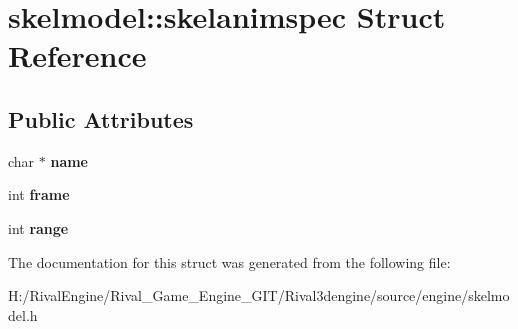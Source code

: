 \hypertarget{structskelmodel_1_1skelanimspec}{}\section{skelmodel\+:\+:skelanimspec Struct Reference}
\label{structskelmodel_1_1skelanimspec}
\subsection*{Public Attributes}
\begin{DoxyCompactItemize}
\item 
\mbox{\label{structskelmodel_1_1skelanimspec_a8b8da05a7f0b52d939d16749913409ad}} 
char $\ast$ {\bfseries name}
\item 
\mbox{\label{structskelmodel_1_1skelanimspec_ae368effcd7e04c2c8758d8c956b1b469}} 
int {\bfseries frame}
\item 
\mbox{\label{structskelmodel_1_1skelanimspec_a9fe763d1d43dceb039e6befda4125ede}} 
int {\bfseries range}
\end{DoxyCompactItemize}


The documentation for this struct was generated from the following file\+:\begin{DoxyCompactItemize}
\item 
H\+:/\+Rival\+Engine/\+Rival\+\_\+\+Game\+\_\+\+Engine\+\_\+\+G\+I\+T/\+Rival3dengine/source/engine/skelmodel.\+h\end{DoxyCompactItemize}
